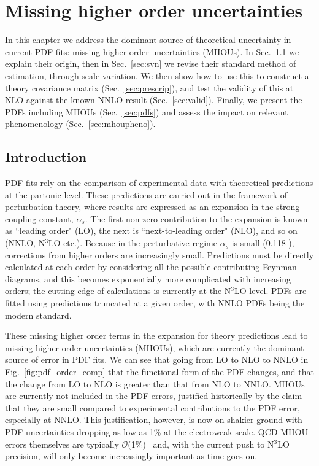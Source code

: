 \chapter{Missing higher order uncertainties}
\label{chapter:mhous}
In this chapter we address the dominant source of theoretical uncertainty in current PDF fits: missing higher order uncertainties (MHOUs). In Sec.~\ref{sec:intro} we explain their origin, then in Sec.~\ref{sec:svn} we revise their standard method of estimation, through scale variation. We then show how to use this to construct a theory covariance matrix (Sec.~\ref{sec:prescrip}), and test the validity of this at NLO against the known NNLO result (Sec.~\ref{sec:valid}). Finally, we present the PDFs including MHOUs (Sec.~\ref{sec:pdfs}) and assess the impact on relevant phenomenology (Sec.~\ref{sec:mhoupheno}).

\section{Introduction}
\label{sec:intro}
PDF fits rely on the comparison of experimental data with theoretical predictions at the partonic level. These predictions are carried out in the framework of perturbation theory, where results are expressed as an expansion in the strong coupling constant, $\alpha_s$. The first non-zero contribution to the expansion is known as ``leading order" (LO), the next is ``next-to-leading order" (NLO), and so on (NNLO, N$^3$LO etc.). Because in the perturbative regime $\alpha_s$ is small (0.118 \cite{pdg}), corrections from higher orders are increasingly small. Predictions must be directly calculated at each order by considering all the possible contributing Feynman diagrams, and this becomes exponentially more complicated with increasing orders; the cutting edge of calculations is currently at the N$^3$LO level. PDFs are fitted using predictions truncated at a given order, with NNLO PDFs being the modern standard. 

These missing higher order terms in the expansion for theory predictions lead to missing higher order uncertainties (MHOUs), which are currently the dominant source of error in PDF fits. We can see that going from LO to NLO to NNLO in Fig.~\ref{fig:pdf_order_comp} that the functional form of the PDF changes, and that the change from LO to NLO is greater than that from NLO to NNLO. MHOUs are currently not included in the PDF errors, justified historically by the claim that they are small compared to experimental contributions to the PDF error, especially at NNLO. This justification, however, is now on shakier ground with PDF uncertainties dropping as low as 1\% at the electroweak scale. QCD MHOU errors themselves are typically $\mathcal{O}$(1\%)~\cite{Campbell:2017hsr} and, with the current push to N$^3$LO precision, will only become increasingly important as time goes on. 

